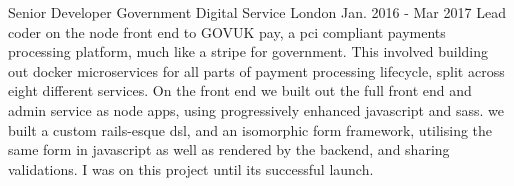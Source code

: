 \begin{cventries}
    \cventry
    {Senior Developer} %
    {Government Digital Service} %
    {London} %
    {Jan. 2016 - Mar 2017} %
    {
      Lead coder on the node front end to GOVUK pay, a pci compliant payments processing platform, much like a stripe for government.
      This involved building out docker microservices for all parts of payment processing lifecycle, split across eight different services. \newline
      \vspace{0.25cm}
      On the front end we built out the full front end and admin service as node apps, using progressively enhanced javascript and sass. we built a custom rails-esque dsl, and an isomorphic form framework, utilising the same form in
      javascript as well as rendered by the backend, and sharing validations.
      I was on this project until its successful launch.
      \vspace{0.25cm}
    }


\end{cventries}
